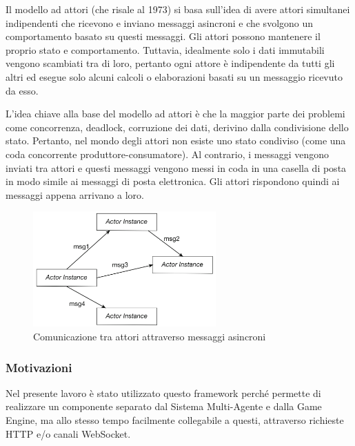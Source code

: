 \medskip

Il modello ad attori (che risale al 1973) si basa sull'idea di avere attori simultanei indipendenti che ricevono e inviano messaggi asincroni e che svolgono un comportamento basato su questi messaggi. Gli attori possono mantenere il proprio stato e comportamento. Tuttavia, idealmente solo i dati immutabili vengono scambiati tra di loro, pertanto ogni attore è indipendente da tutti gli altri ed esegue solo alcuni calcoli o elaborazioni basati su un messaggio ricevuto da esso.

\medskip

L'idea chiave alla base del modello ad attori è che la maggior parte dei problemi come concorrenza, deadlock, corruzione dei dati, derivino dalla condivisione dello stato. Pertanto, nel mondo degli attori non esiste uno stato condiviso (come una coda concorrente produttore-consumatore). Al contrario, i messaggi vengono inviati tra attori e questi messaggi vengono messi in coda in una casella di posta in modo simile ai messaggi di posta elettronica. Gli attori rispondono quindi ai messaggi appena arrivano a loro.\cite{play_framework_book}

\begin{figure}[H]
\centering
\includegraphics[width=7cm]{figures/Actors_communicating.png}
\caption{Comunicazione tra attori attraverso messaggi asincroni\cite{akka}}
\end{figure}

\subsubsection*{Motivazioni}
Nel presente lavoro è stato utilizzato questo framework perché permette di realizzare un componente separato dal Sistema Multi-Agente e dalla Game Engine, ma allo stesso tempo facilmente collegabile a questi, attraverso richieste HTTP e/o canali WebSocket.